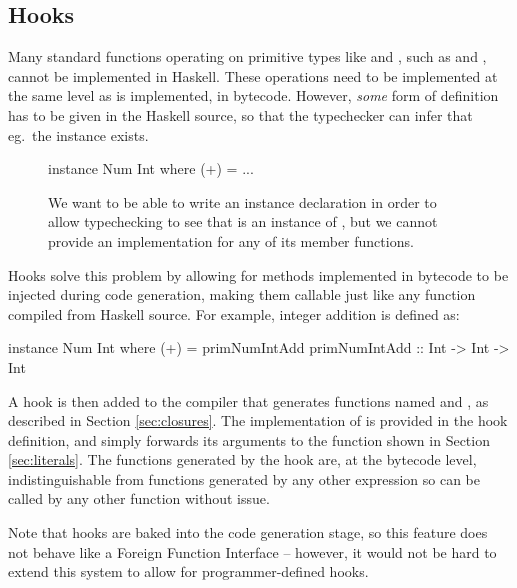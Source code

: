 \documentclass[dissertation.tex]{subfiles}
\begin{document}
{    \subsection{Hooks}\label{sec:hooks}
    {
        Many standard functions operating on primitive types like  and , such as \haskell{(+)} and \haskell{(==)}, cannot be implemented in Haskell. These operations need to be implemented at the same level as  is implemented, in bytecode. However, \textit{some} form of definition has to be given in the Haskell source, so that the typechecker can infer that eg.\ the instance exists.

        \begin{figure}[h]
        \begin{haskellfigure}
        instance Num Int where
            (+) = ...
        \end{haskellfigure}
        \caption{We want to be able to write an instance declaration in order to allow typechecking to see that  is an instance of , but we cannot provide an implementation for any of its member functions.}
        \end{figure}

        Hooks solve this problem by allowing for methods implemented in bytecode to be injected during code generation, making them callable just like any function compiled from Haskell source. For example, integer addition is defined as:

        \begin{haskellfigure}
        instance Num Int where
            (+) = primNumIntAdd
        primNumIntAdd :: Int -> Int -> Int
        \end{haskellfigure}

        A hook is then added to the compiler that generates functions named  and , as described in Section \ref{sec:closures}. The implementation of  is provided in the hook definition, and simply forwards its arguments to the  function shown in Section \ref{sec:literals}. The functions generated by the hook are, at the bytecode level, indistinguishable from functions generated by any other expression so can be called by any other function without issue.

        Note that hooks are baked into the code generation stage, so this feature does not behave like a Foreign Function Interface -- however, it would not be hard to extend this system to allow for programmer-defined hooks.
    }
}
\end{document}
